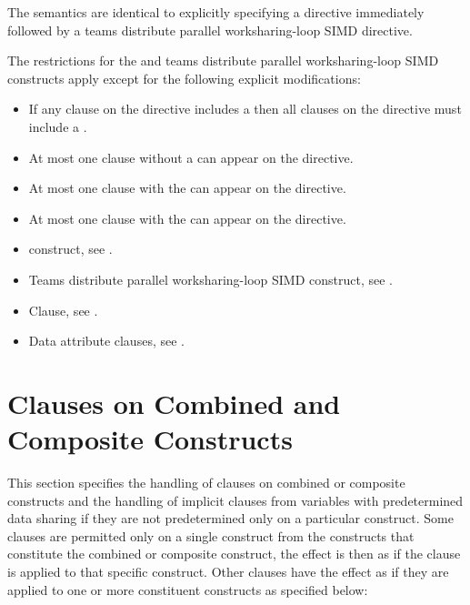 \descr
The semantics are identical to explicitly specifying a 
directive immediately followed by a teams distribute parallel worksharing-loop
SIMD directive. 


\restrictions
The restrictions for the  and teams distribute parallel
worksharing-loop SIMD constructs apply except for the following explicit
 modifications:

\begin{itemize}
\item If any  clause on the directive includes a
       then all  clauses
      on the directive must include a .
\item At most one  clause without a
       can appear on the directive.
\item At most one  clause with the 
       can appear on the directive.
\item At most one  clause with the 
       can appear on the directive.
\end{itemize}

\crossreferences
\begin{itemize}
\item {} construct, see .

\item Teams distribute parallel worksharing-loop SIMD construct, see
.

\item {} Clause, see .

\item Data attribute clauses, see
.
\end{itemize}



\section{Clauses on Combined and Composite Constructs}
\label{sec:Clauses on Combined and Composite Constructs}
This section specifies the handling of clauses on combined or composite constructs 
and the handling of implicit clauses from variables with predetermined data sharing 
if  they are not predetermined only on a particular construct. Some clauses are 
permitted only on a single construct from the constructs that constitute the 
combined or composite construct, the effect is then as if the clause is applied 
to that specific construct.  Other clauses have the effect as if they are applied 
to one or more constituent constructs as specified below:

